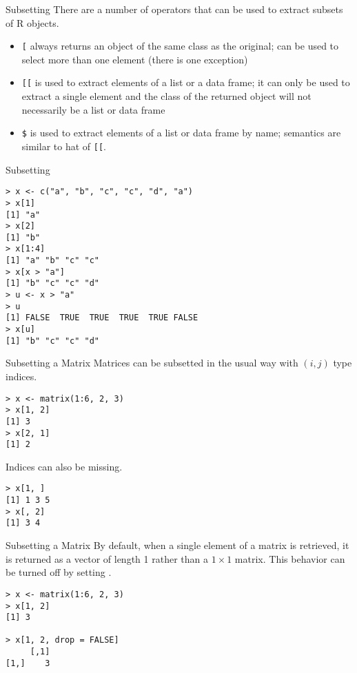 \documentclass[aspectratio=169]{beamer}
\begin{document}
\begin{frame}[fragile]{Subsetting}
There are a number of operators that can be used to extract subsets of
R objects.
\begin{itemize}
\item
\verb+[+ always returns an object of the same class as the original;
can be used to select more than one element (there is one exception)
\item
\verb+[[+ is used to extract elements of a list or a data frame; it
can only be used to extract a single element and the class of the
returned object will not necessarily be a list or data frame
\item
\verb+$+ is used to extract elements of a list or data frame by name;
semantics are similar to hat of \verb+[[+.
\end{itemize}
\end{frame}

\begin{frame}[fragile]{Subsetting}
\begin{verbatim}
> x <- c("a", "b", "c", "c", "d", "a")
> x[1]
[1] "a"
> x[2]
[1] "b"
> x[1:4]
[1] "a" "b" "c" "c"
> x[x > "a"]
[1] "b" "c" "c" "d"
> u <- x > "a"
> u
[1] FALSE  TRUE  TRUE  TRUE  TRUE FALSE
> x[u]
[1] "b" "c" "c" "d"
\end{verbatim}
\end{frame}

\begin{frame}[fragile]{Subsetting a Matrix}
Matrices can be subsetted in the usual way with $(i, j)$ type indices.
\begin{verbatim}
> x <- matrix(1:6, 2, 3)
> x[1, 2]
[1] 3
> x[2, 1]
[1] 2
\end{verbatim}
Indices can also be missing.
\begin{verbatim}
> x[1, ]
[1] 1 3 5
> x[, 2]
[1] 3 4
\end{verbatim}
\end{frame}

\begin{frame}[fragile]{Subsetting a Matrix}
By default, when a single element of a matrix is retrieved, it is
returned as a vector of length 1 rather than a $1\times 1$ matrix.
This behavior can be turned off by setting .
\begin{verbatim}
> x <- matrix(1:6, 2, 3)
> x[1, 2]
[1] 3

> x[1, 2, drop = FALSE]
     [,1]
[1,]    3
\end{verbatim}
\end{frame}
\end{document}
